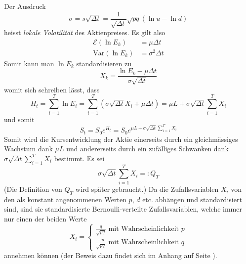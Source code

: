 \documentclass[11pt]{report} %
\begin{document}
Der Ausdruck $$\sigma=s\sqrt{\Delta t}=\frac{1}{\sqrt{\Delta t}}\sqrt{pq}(\ln{u}-\ln{d})$$ heisst \textit{lokale Volatilität} des Aktienpreises.
Es gilt also
\begin{align*}
    \mathcal{E}(\ln{E_k})&=\mu\Delta t\\
    \text{Var}(\ln{E_k})&=\sigma^2\Delta t
\end{align*}
Somit kann man $\ln{E_k}$ standardisieren zu $$X_k=\frac{\ln{E_k}-\mu\Delta t}{\sigma\sqrt{\Delta t}}$$\label{vorheriger-abschnitt}
womit sich schreiben lässt, dass $$H_t=\sum_{i=1}^{T}\ln{E_i}=\sum_{i=1}^{T}(\sigma\sqrt{\Delta t}X_i+\mu\Delta t)=\mu L+\sigma\sqrt{\Delta t}\sum_{i=1}^{T}X_i$$ und somit $$S_t=S_0e^{H_t}=S_0e^{\mu L+\sigma\sqrt{\Delta t}\sum_{i=1}^{T}X_i}$$
Somit wird die Kursentwicklung der Aktie einerseits durch ein gleichmässiges Wachstum dank $\mu L$ und andererseits durch ein zufälliges Schwanken dank $\sigma\sqrt{\Delta t}\sum_{i=1}^{T}X_i$ bestimmt. Es sei $$\sigma\sqrt{\Delta t}\sum_{i=1}^{T}X_i=:Q_T$$ (Die Definition von $Q_T$ wird später gebraucht.) Da die Zufallsvariablen $X_i$ von den als konstant angenommenen Werten $p$, $d$ etc. abhängen und standardisiert sind, sind sie standardisierte Bernoulli-verteilte Zufallsvariablen, welche immer nur einen der beiden Werte $$X_i=\begin{cases}
    \frac{q}{\sqrt{pq}} \text{ mit Wahrscheinlichkeit $p$}\\
    \frac{-p}{\sqrt{pq}} \text{ mit Wahrscheinlichkeit $q$}
\end{cases}$$ annehmen können (der Beweis dazu findet sich im Anhang auf Seite \pageref{proof:bernoulli-dist-rand-var}). 
\end{document}

